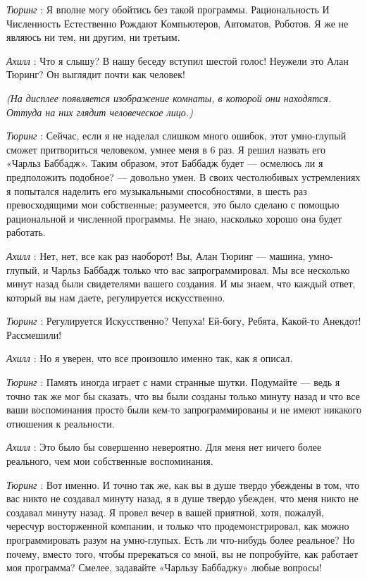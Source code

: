 \documentclass[../main.tex]{subfiles}
\begin{document}
\begin{dialogue}
\emph{Тюринг} : Я вполне могу обойтись без такой программы. Рациональность И Численность Естественно Рождают Компьютеров, Автоматов, Роботов. Я же не являюсь ни тем, ни другим, ни третьим.

\emph{Ахилл} : Что я слышу? В нашу беседу вступил шестой голос! Неужели это Алан Тюринг? Он выглядит почти как человек!

\emph{(На дисплее появляется изображение комнаты, в которой они находятся. Оттуда на них глядит человеческое лицо.)}

\emph{Тюринг} : Сейчас, если я не наделал слишком много ошибок, этот умно-глупый сможет притвориться человеком, умнее меня в 6 раз. Я решил назвать его «Чарльз Баббадж». Таким образом, этот Баббадж будет --- осмелюсь ли я предположить подобное? --- довольно умен. В своих честолюбивых устремлениях я попытался наделить его музыкальными способностями, в шесть раз превосходящими мои собственные; разумеется, это было сделано с помощью рациональной и численной программы. Не знаю, насколько хорошо она будет работать.

\emph{Ахилл} : Нет, нет, все как раз наоборот! Вы, Алан Тюринг --- машина, умно-глупый, и Чарльз Баббадж только что вас запрограммировал. Мы все несколько минут назад были свидетелями вашего создания. И мы знаем, что каждый ответ, который вы нам даете, регулируется искусственно.

\emph{Тюринг} : Регулируется Искусственно? Чепуха! Ей-богу, Ребята, Какой-то Анекдот! Рассмешили!

\emph{Ахилл} : Но я уверен, что все произошло именно так, как я описал.

\emph{Тюринг} : Память иногда играет с нами странные шутки. Подумайте --- ведь я точно так же мог бы сказать, что вы были созданы только минуту назад и что все ваши воспоминания просто были кем-то запрограммированы и не имеют никакого отношения к реальности.

\emph{Ахилл} : Это было бы совершенно невероятно. Для меня нет ничего более реального, чем мои собственные воспоминания.

\emph{Тюринг} : Вот именно. И точно так же, как вы в душе твердо убеждены в том, что вас никто не создавал минуту назад, я в душе твердо убежден, что меня никто не создавал минуту назад. Я провел вечер в вашей приятной, хотя, пожалуй, чересчур восторженной компании, и только что продемонстрировал, как можно программировать разум на умно-глупых. Есть ли что-нибудь более реальное? Но почему, вместо того, чтобы пререкаться со мной, вы не попробуйте, как работает моя программа? Смелее, задавайте «Чарльзу Баббаджу» любые вопросы!


\end{dialogue}
\end{document}

